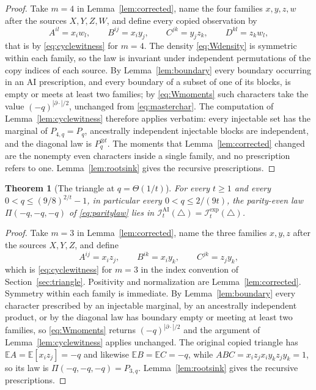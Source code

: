 \documentclass[11pt]{article}
\theoremstyle{plain}
\newtheorem{theorem}{Theorem}[section]
\theoremstyle{definition}
\newcommand{\IAI}{\mathcal I^{\mathrm{AI}}}
\newcommand{\Iexp}{\mathcal I^{\mathrm{exp}}}
\newcommand{\E}{\mathbb E}
\begin{document}
\begin{proof}
Take $m=4$ in Lemma~\ref{lem:corrected}, name the four families $x,y,z,w$ after the sources $X,Y,Z,W$, and define every copied observation by
\[
A^{il}=x_iw_l,\qquad B^{ij}=x_iy_j,\qquad C^{jk}=y_jz_k,\qquad D^{kl}=z_kw_l,
\]
that is by \eqref{eq:cyclewitness} for $m=4$. The density \eqref{eq:Wdensity} is symmetric within each family, so the law is invariant under independent permutations of the copy indices of each source. By Lemma~\ref{lem:boundary} every boundary occurring in an AI prescription, and every boundary of a subset of one of its blocks, is empty or meets at least two families; by \eqref{eq:Wmoments} such characters take the value $(-q)^{|\partial\cdot|/2}$, unchanged from \eqref{eq:masterchar}. The computation of Lemma~\ref{lem:cyclewitness} therefore applies verbatim: every injectable set has the marginal of $P_{4,q}=P_q$, ancestrally independent injectable blocks are independent, and the diagonal law is $P_q^{\otimes t}$. The moments that Lemma~\ref{lem:corrected} changed are the nonempty even characters inside a single family, and no prescription refers to one. Lemma~\ref{lem:rootsink} gives the recursive prescriptions.
\end{proof}

\begin{theorem}[The triangle at $q=\Theta(1/t)$]\label{thm:trianglelinear}
For every $t\ge1$ and every $0<q\le(9/8)^{2/t}-1$, in particular every $0<q\le2/(9t)$, the parity-even law $\Pi(-q,-q,-q)$ of \eqref{eq:paritylaw} lies in $\IAI_t(\triangle)=\Iexp_t(\triangle)$.
\end{theorem}

\begin{proof}
Take $m=3$ in Lemma~\ref{lem:corrected}, name the three families $x,y,z$ after the sources $X,Y,Z$, and define
\[
A^{ij}=x_iz_j,\qquad B^{ik}=x_iy_k,\qquad C^{jk}=z_jy_k,
\]
which is \eqref{eq:cyclewitness} for $m=3$ in the index convention of Section~\ref{sec:triangle}. Positivity and normalization are Lemma~\ref{lem:corrected}. Symmetry within each family is immediate. By Lemma~\ref{lem:boundary} every character prescribed by an injectable marginal, by an ancestrally independent product, or by the diagonal law has boundary empty or meeting at least two families, so \eqref{eq:Wmoments} returns $(-q)^{|\partial\cdot|/2}$ and the argument of Lemma~\ref{lem:cyclewitness} applies unchanged. The original copied triangle has $\E A=\E[x_iz_j]=-q$ and likewise $\E B=\E C=-q$, while $ABC=x_iz_jx_iy_kz_jy_k=1$, so its law is $\Pi(-q,-q,-q)=P_{3,q}$. Lemma~\ref{lem:rootsink} gives the recursive prescriptions.
\end{proof}
\end{document}
